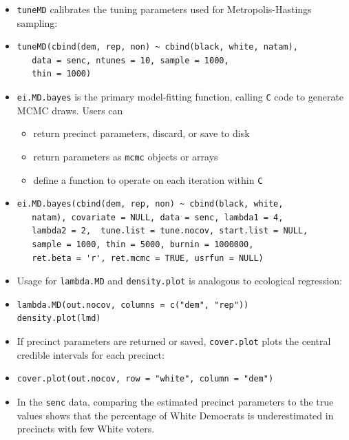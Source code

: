 \documentclass{article}
\renewcommand{\small}{\fontsize{24.88}{30}\selectfont}
\begin{document}
\begin{textblock}{12}
\begin{itemize}
\item \texttt{tuneMD} calibrates the tuning
parameters used for Metropolis-Hastings sampling:
\item[] {\small\begin{verbatim}
tuneMD(cbind(dem, rep, non) ~ cbind(black, white, natam), 
   data = senc, ntunes = 10, sample = 1000, 
   thin = 1000)
\end{verbatim}}
\item \texttt{ei.MD.bayes} is the primary model-fitting function,
calling \texttt{C} code to generate MCMC draws.  Users
can
\begin{itemize}
\item return precinct parameters, discard, or save to disk
\item return parameters as \texttt{mcmc} objects or arrays
\item define a function to operate on each iteration within \texttt{C}
\end{itemize}
\item[] {\small
\begin{verbatim}
ei.MD.bayes(cbind(dem, rep, non) ~ cbind(black, white, 
   natam), covariate = NULL, data = senc, lambda1 = 4, 
   lambda2 = 2,  tune.list = tune.nocov, start.list = NULL, 
   sample = 1000, thin = 5000, burnin = 1000000, 
   ret.beta = 'r', ret.mcmc = TRUE, usrfun = NULL)
\end{verbatim}}
\item Usage for \texttt{lambda.MD} and \texttt{density.plot} is analogous to
ecological regression:
\item[] {\small\begin{verbatim}
lambda.MD(out.nocov, columns = c("dem", "rep"))
density.plot(lmd)
\end{verbatim}}
\item If precinct parameters are returned or saved, \texttt{cover.plot}
plots the central credible intervals for each precinct:  
\item[]{\small\begin{verbatim}
cover.plot(out.nocov, row = "white", column = "dem")
\end{verbatim}}
\item In the \texttt{senc} data, comparing the estimated precinct
parameters to the true values shows that the percentage of White Democrats is
underestimated in precincts with few White voters.
\end{itemize}
\end{textblock}
\end{document}
